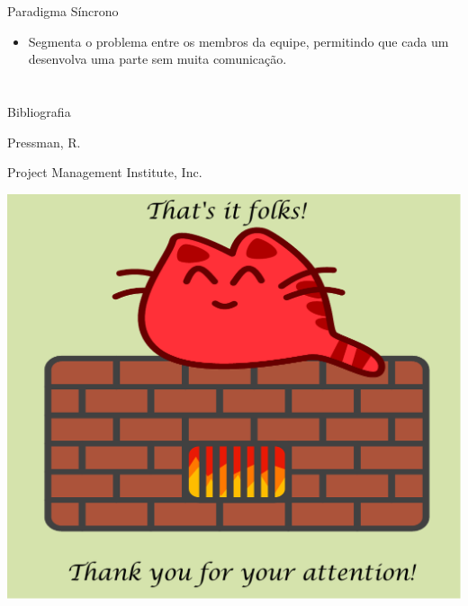 \documentclass[xcolor=x11names,compress]{beamer}
\begin{document}
\begin{frame}{Paradigma Síncrono}

\begin{itemize}
\itemsep 5mm

\item Segmenta o problema entre os membros da equipe, permitindo que cada um desenvolva uma parte sem muita comunicação.

\end{itemize}

\end{frame}

\section{}

\begin{frame}{Bibliografia}

\begin{thebibliography}{Pressman, 2001}


Pressman, R.



Project Management Institute, Inc.


\end{thebibliography}

\end{frame}

\begin{frame}

\begin{center}
\includegraphics[keepaspectratio, width=.8\textwidth]{template/happycat-end}
\end{center}
\end{frame}
\end{document}
